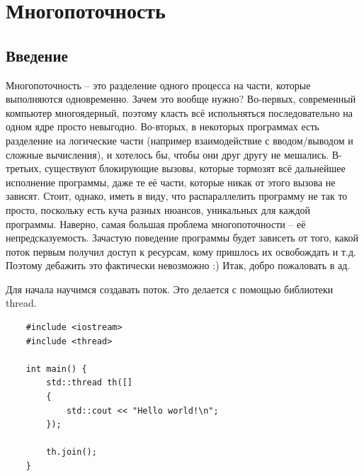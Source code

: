 \documentclass[12pt, a4paper]{article}
\begin{document}
\section{Многопоточность}
\subsection{Введение}
Многопоточность -- это разделение одного процесса на части, которые выполняются одновременно. Зачем это вообще нужно? Во-первых, современный компьютер многоядерный, поэтому класть всё испольняться последовательно на одном ядре просто невыгодно. Во-вторых, в некоторых программах есть разделение на логические части (например взаимодействие с вводом/выводом и сложные вычисления), и хотелось бы, чтобы они друг другу не мешались. В-третьих, существуют блокирующие вызовы, которые тормозят всё дальнейшее исполнение программы, даже те её части, которые никак от этого вызова не зависят. Стоит, однако, иметь в виду, что распараллелить программу не так то просто, поскольку есть куча разных нюансов, уникальных для каждой программы. 
Наверно, самая большая проблема многопоточности -- её непредсказуемость. Зачастую поведение программы будет зависеть от того, какой поток первым получил доступ к ресурсам, кому пришлось их освобождать и т.д. Поэтому дебажить это фактически невозможно :) Итак, добро пожаловать в ад.
\par Для начала научимся создавать поток. Это делается с помощью библиотеки thread.
\begin{verbatim}
	#include <iostream>
	#include <thread>
	
	int main() {
		std::thread th([]
		{
			std::cout << "Hello world!\n";
		});
		
		th.join();
	}
\end{verbatim}
\end{document}
